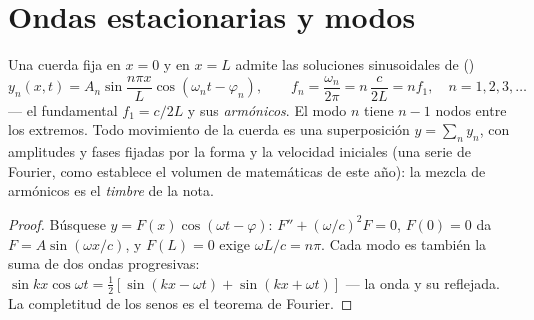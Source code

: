 \section{Ondas estacionarias y modos}

\begin{proposition}\label{prop:b2:waves-on-strings:modes}
Una cuerda fija en $x = 0$ y en $x = L$ admite las soluciones sinusoidales
de  (\emph{})
\[
y_n(x, t) = A_n\sin\frac{n\pi x}{L}\cos(\omega_nt - \varphi_n) , \qquad
f_n = \frac{\omega_n}{2\pi} = n\,\frac{c}{2L} = n f_1 , \quad n = 1, 2, 3, \dots
\]
--- el fundamental $f_1 = c/2L$ y sus \emph{armónicos}. El modo $n$ tiene
$n - 1$ nodos entre los extremos. Todo movimiento de la cuerda es una
superposición $y = \sum_ny_n$, con amplitudes y fases fijadas por la forma
y la velocidad iniciales (una serie de Fourier, como establece el volumen
de matemáticas de este año): la mezcla de armónicos es el \emph{timbre} de
la nota.
\end{proposition}

\begin{proof}
Búsquese $y = F(x)\cos(\omega t - \varphi)$: $F'' + (\omega/c)^2F = 0$, $F(0) = 0$ da
$F = A\sin(\omega x/c)$, y $F(L) = 0$ exige $\omega L/c = n\pi$. Cada modo es
también la suma de dos ondas progresivas: $\sin kx\cos\omega t = \tfrac12[\sin(kx -
\omega t) + \sin(kx + \omega t)]$ --- la onda y su reflejada. La
completitud de los senos es el teorema de Fourier.
\end{proof}

